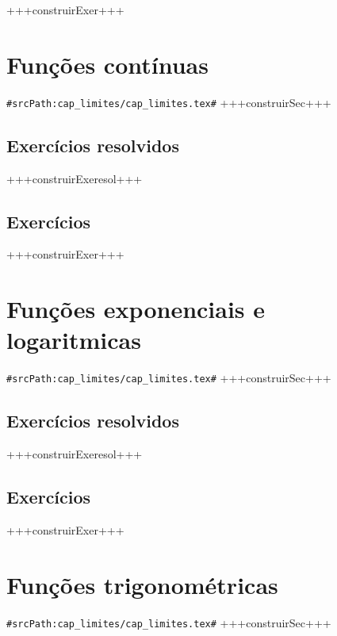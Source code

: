 +++construirExer+++


\section{Funções contínuas}
\verb+#srcPath:cap_limites/cap_limites.tex#+
\label{sec:limites_fun_cont}
+++construirSec+++

\subsection*{Exercícios resolvidos}

+++construirExeresol+++


\subsection*{Exercícios}

+++construirExer+++


\section{Funções exponenciais e logaritmicas}
\verb+#srcPath:cap_limites/cap_limites.tex#+
\label{sec:limites_exp_log}
+++construirSec+++

\subsection*{Exercícios resolvidos}

+++construirExeresol+++


\subsection*{Exercícios}

+++construirExer+++


\section{Funções trigonométricas}
\verb+#srcPath:cap_limites/cap_limites.tex#+
\label{sec:limites_fun_trigo} %
+++construirSec+++

